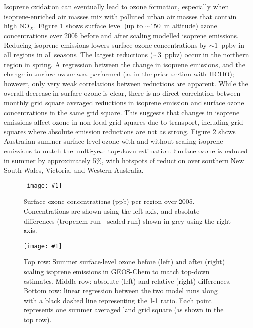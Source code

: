 \documentclass[acp, manuscript]{copernicus}
\newcommand{\mypic}[3]{%
  \begin{figure}
    \texttt{[image: \#1]}
    \caption{#2}
    #3
  \end{figure}
}
\begin{document}
      Isoprene oxidation can eventually lead to ozone formation, especially when isoprene-enriched air masses mix with polluted urban air masses that contain high NO$_X$.
      Figure \ref{BioIsop:results:emissions:fig_new_emiss_series_O3} shows surface level (up to $\sim{150}$~m altitude) ozone concentrations over 2005 before and after scaling modelled isoprene emissions.
      Reducing isoprene emissions lowers surface ozone concentrations by $\sim1$~ppbv in all regions in all seasons.
      The largest reductions ($\sim3$~ppbv) occur in the northern region in spring.
      A regression between the change in isoprene emissions, and the change in surface ozone was performed (as in the prior section with HCHO); however, only very weak correlations between reductions are apparent.
      While the overall decrease in surface ozone is clear, there is no direct correlation between monthly grid square averaged reductions in isoprene emission and surface ozone concentrations in the same grid square.
      This suggests that changes in isoprene emissions affect ozone in non-local grid squares due to transport, including grid squares where absolute emission reductions are not as strong.
      Figure \ref{BioIsop:results:emissions:fig_ozone_surf_summer} shows Australian summer surface level ozone with and without scaling isoprene emissions to match the multi-year top-down estimation.
      Surface ozone is reduced in summer by approximately 5\%, with hotspots of reduction over southern New South Wales, Victoria, and Western Australia.
      
      \mypic{Figures/new_emiss/O3_surface_20050101_20051231.png}{%
        Surface ozone concentrations (ppb) per region over 2005.
        Concentrations are shown using the left axis, and absolute differences (tropchem run - scaled run) shown in grey using the right axis.
      }{\label{BioIsop:results:emissions:fig_new_emiss_series_O3}}
      
      
      \mypic{Figures/new_emiss/O3_surf_map_Summer_05.png}{%
        Top row: Summer surface-level ozone before (left) and after (right) scaling isoprene emissions in GEOS-Chem to match top-down estimates.
        Middle row: absolute (left) and relative (right) differences.
        Bottom row: linear regression between the two model runs along with a black dashed line representing the 1-1 ratio.
        Each point represents one summer averaged land grid square (as shown in the top row).
      }{\label{BioIsop:results:emissions:fig_ozone_surf_summer}}
      
\end{document}
